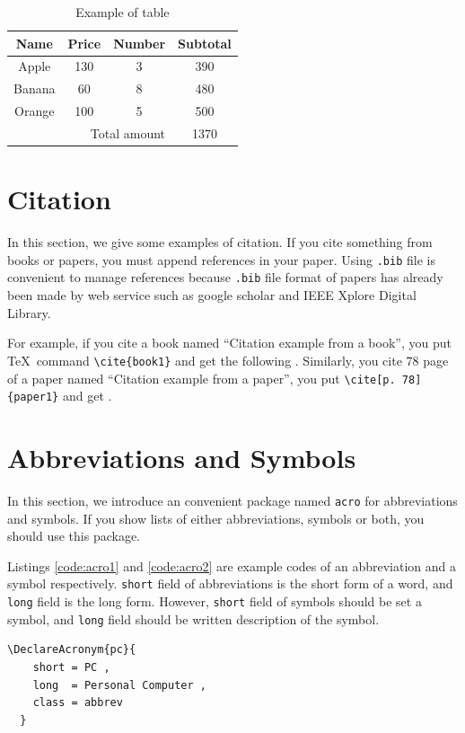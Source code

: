 \begin{table}[htbp]
  \centering
  \caption{Example of table}
  \label{table:1}
  \begin{tabular}{c|cc|c}
    Name & Price & Number & Subtotal \\
    \hline
    Apple  & 130 & 3 & 390 \\
    Banana &  60 & 8 & 480 \\
    Orange & 100 & 5 & 500 \\
    \hline
    \multicolumn{3}{r|}{Total amount} & 1370
  \end{tabular}
\end{table}

\section{Citation}
In this section, we give some examples of citation. If you cite something from books or papers, you must append references in your paper. Using \texttt{.bib} file is convenient to manage references because \texttt{.bib} file format of papers has already been made by web service such as google scholar and IEEE Xplore Digital Library.

For example, if you cite a book named ``Citation example from a book'', you put \TeX\, command \verb+\cite{book1}+ and get the following \cite{book1}. Similarly, you cite 78 page of a paper named ``Citation example from a paper'', you put \verb+\cite[p. 78]{paper1}+ and get \cite[p. 78]{paper1}.

\section{Abbreviations and Symbols}
In this section, we introduce an convenient package named \texttt{acro} for abbreviations and symbols. If you show lists of either abbreviations, symbols or both, you should use this package. 

Listings \ref{code:acro1} and \ref{code:acro2} are example codes of an abbreviation and a symbol respectively. \texttt{short} field of abbreviations is the short form of a word, and \texttt{long} field is the long form. However, \texttt{short} field of symbols should be set a symbol, and \texttt{long} field should be written description of the symbol.

\begin{lstlisting}[caption=Example of a definition for an abbreviation, label=code:acro1]
  \DeclareAcronym{pc}{
    short = PC ,
    long  = Personal Computer ,
    class = abbrev
  }
\end{lstlisting}

